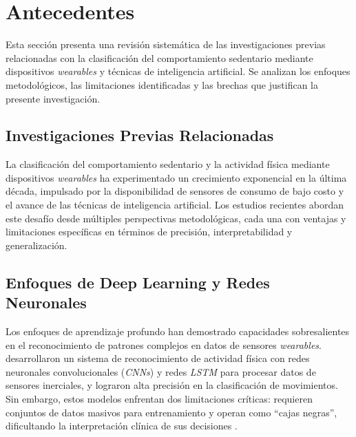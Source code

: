 \section{Antecedentes}
\label{sec:antecedentes}

Esta sección presenta una revisión sistemática de las investigaciones previas relacionadas con la clasificación del comportamiento sedentario mediante dispositivos \textit{wearables} y técnicas de inteligencia artificial. Se analizan los enfoques metodológicos, las limitaciones identificadas y las brechas que justifican la presente investigación.

\subsection{Investigaciones Previas Relacionadas}
\label{subsec:investigaciones_previas}


La clasificación del comportamiento sedentario y la actividad física mediante dispositivos \textit{wearables} ha experimentado un crecimiento exponencial en la última década, impulsado por la disponibilidad de sensores de consumo de bajo costo y el avance de las técnicas de inteligencia artificial. Los estudios recientes abordan este desafío desde múltiples perspectivas metodológicas, cada una con ventajas y limitaciones específicas en términos de precisión, interpretabilidad y generalización.

\subsection{Enfoques de Deep Learning y Redes Neuronales}
\label{subsec:deep_learning}

Los enfoques de aprendizaje profundo han demostrado capacidades sobresalientes en el reconocimiento de patrones complejos en datos de sensores \textit{wearables}. \cite{Khan2024Wearable} desarrollaron un sistema de reconocimiento de actividad física con redes neuronales convolucionales (\textit{CNNs}) y redes \textit{LSTM} para procesar datos de sensores inerciales, y lograron alta precisión en la clasificación de movimientos. Sin embargo, estos modelos enfrentan dos limitaciones críticas: requieren conjuntos de datos masivos para entrenamiento y operan como ``cajas negras'', dificultando la interpretación clínica de sus decisiones \cite{Bienefeld2023XAI}.

